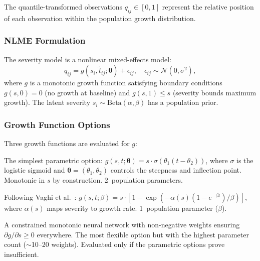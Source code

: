 The quantile-transformed observations $q_{ij} \in [0, 1]$ represent the
relative position of each observation within the population growth
distribution.

\subsubsection{NLME Formulation}

The severity model is a nonlinear mixed-effects model:
\begin{equation}
  q_{ij} = g(s_i, \tilde{t}_{ij}; \boldsymbol{\theta}) + \epsilon_{ij},
  \quad \epsilon_{ij} \sim \mathcal{N}(0, \sigma^2),
  \label{eq:severity_nlme}
\end{equation}
where $g$ is a monotonic growth function satisfying boundary conditions
$g(s, 0) = 0$ (no growth at baseline) and $g(s, 1) \leq s$ (severity bounds
maximum growth). The latent severity $s_i \sim \text{Beta}(\alpha, \beta)$ has
a population prior.

\subsubsection{Growth Function Options}

Three growth functions are evaluated for $g$:

\begin{description}[leftmargin=*,labelwidth=!]
  \item[Sigmoid.] The simplest parametric option:
    $g(s, t; \boldsymbol{\theta}) = s \cdot \sigma(\theta_1 (t - \theta_2))$,
    where $\sigma$ is the logistic sigmoid and
    $\boldsymbol{\theta} = (\theta_1, \theta_2)$ controls the steepness and
    inflection point. Monotonic in $s$ by construction. 2~population
    parameters.

  \item[Reduced Gompertz.] Following Vaghi et al.\
    \cite{vaghi2020reduced}:
    $g(s, t; \beta) = s \cdot [1 - \exp(-\alpha(s)(1 - e^{-\beta t})/\beta)]$,
    where $\alpha(s)$ maps severity to growth rate. 1~population parameter
    ($\beta$).

  \item[CMNN.] A constrained monotonic neural network
    \cite{runje2023cmnn} with non-negative weights ensuring
    $\partial g / \partial s \geq 0$ everywhere. The most flexible option
    but with the highest parameter count ($\sim$10--20 weights). Evaluated
    only if the parametric options prove insufficient.
\end{description}


